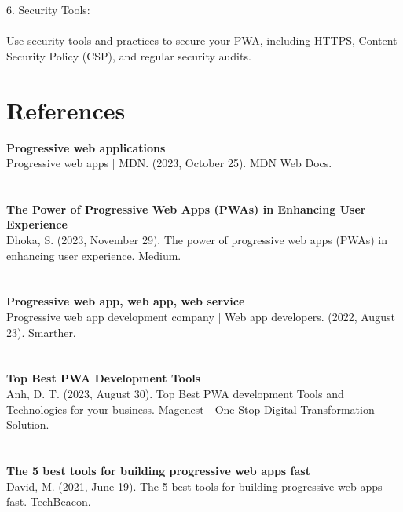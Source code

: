 \documentclass[journal]{IEEEtran}
\begin{document}
6. Security Tools:\\
   \\Use security tools and practices to secure your PWA, including HTTPS, Content Security Policy (CSP), and regular security audits.\\

    \section{References}
        \textbf{Progressive web applications}\\
        Progressive web apps | MDN. (2023, October 25). MDN Web Docs. \\\hyperlink{https://developer.mozilla.org/en-US/docs/Web/Progressive_web_apps}\\
        \\\textbf{The Power of Progressive Web Apps (PWAs) in Enhancing User Experience}\\
        Dhoka, S. (2023, November 29). The power of progressive web apps (PWAs) in enhancing user experience. Medium. 
        \\\hyperlink{https://medium.com/@simrandhoka067/the-power-of-progressive-web-apps-pwas-in-enhancing-user-experience-e1e25328ec1f}\\
        \\\textbf{Progressive web app, web app, web service}\\
        Progressive web app development company | Web app developers. (2022, August 23). Smarther. \\\hyperlink{https://www.smarther.co/progressive-web-app-development-company/}\\
        \\\textbf{Top Best PWA Development Tools}\\
        Anh, D. T. (2023, August 30). Top Best PWA development Tools and Technologies for your business. Magenest - One-Stop Digital Transformation Solution. 
        \\\hyperlink{https://magenest.com/en/pwa-development-tools/}\\
        \\\textbf{The 5 best tools for building progressive web apps fast}\\
        David, M. (2021, June 19). The 5 best tools for building progressive web apps fast. TechBeacon. \\\hyperlink{https://techbeacon.com/app-dev-testing/5-best-tools-building-progressive-web-apps-fast}\\
\end{document}

